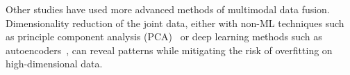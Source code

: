 %
Other studies have used more advanced methods of multimodal data fusion.
Dimensionality reduction of the joint data, either with non-ML techniques such as principle component analysis (PCA)~\cite{behlerMultimodalVivoStaging2022} or deep learning methods such as autoencoders~\cite{kmetzschDiseaseProgressionScore2022a}, can reveal patterns while mitigating the risk of overfitting on high-dimensional data.

